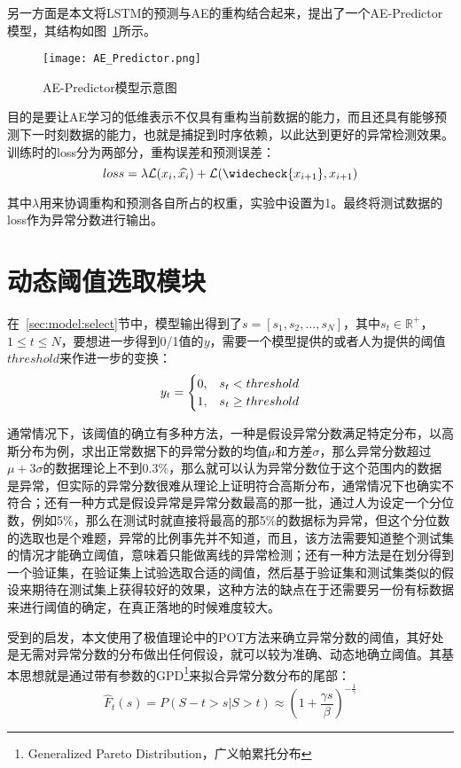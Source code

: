 另一方面是本文将LSTM的预测与AE的重构结合起来，提出了一个AE-Predictor模型，其结构如图~\ref{fig:AE-Predictor}所示。

\begin{figure}[htbp]
  \centering
  \texttt{[image: AE\_Predictor.png]}
  \caption{AE-Predictor模型示意图}
  \label{fig:AE-Predictor}
\end{figure}

目的是要让AE学习的低维表示不仅具有重构当前数据的能力，而且还具有能够预测下一时刻数据的能力，也就是捕捉到时序依赖，以此达到更好的异常检测效果。训练时的loss分为两部分，重构误差和预测误差：
\begin{equation*}
  loss = \lambda \mathcal{L}(x_i,\widehat{x_{i}}) + \mathcal{L}(\widecheck{x_{i+1}},x_{i+1})
\end{equation*}

其中$\lambda$用来协调重构和预测各自所占的权重，实验中设置为1。最终将测试数据的loss作为异常分数进行输出。

\section{动态阈值选取模块}
在~\ref{sec:model:select}节中，模型输出得到了$s = [s_1, s_2,\dots,s_N]$，其中$s_t\in \mathbb{R}^+$，$1\leq t\leq N$，要想进一步得到0/1值的$y$，需要一个模型提供的或者人为提供的阈值$threshold$来作进一步的变换：
\begin{equation*}
  y_t = \begin{cases}
    0, & s_t < threshold \cr
    1, & s_t \geq threshold
  \end{cases}
\end{equation*}

通常情况下，该阈值的确立有多种方法，一种是假设异常分数满足特定分布，以高斯分布为例，求出正常数据下的异常分数的均值$\mu$和方差$\sigma$，那么异常分数超过$\mu + 3\sigma$的数据理论上不到0.3\%，那么就可以认为异常分数位于这个范围内的数据是异常，但实际的异常分数很难从理论上证明符合高斯分布，通常情况下也确实不符合；还有一种方式是假设异常是异常分数最高的那一批，通过人为设定一个分位数，例如5\%，那么在测试时就直接将最高的那5\%的数据标为异常，但这个分位数的选取也是个难题，异常的比例事先并不知道，而且，该方法需要知道整个测试集的情况才能确立阈值，意味着只能做离线的异常检测；还有一种方法是在划分得到一个验证集，在验证集上试验选取合适的阈值，然后基于验证集和测试集类似的假设来期待在测试集上获得较好的效果，这种方法的缺点在于还需要另一份有标数据来进行阈值的确定，在真正落地的时候难度较大。

受到\cite{siffer2017anomaly}的启发，本文使用了极值理论中的POT方法来确立异常分数的阈值，其好处是无需对异常分数的分布做出任何假设，就可以较为准确、动态地确立阈值。其基本思想就是通过带有参数的GPD\footnote{Generalized Pareto Distribution，广义帕累托分布}来拟合异常分数分布的尾部：
\begin{equation*}
  \hat{F}_{t}(s) = P(S - t > s | S > t) \approx (1 + \frac{\gamma s}{\beta})^{-\frac{1}{\gamma}}
\end{equation*}

